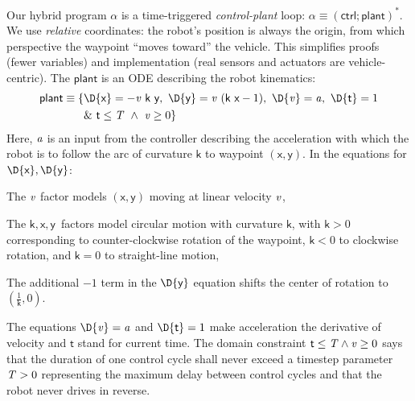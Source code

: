 \documentclass[12pt]{cmuthesis}
\theoremstyle{definition}
\theoremstyle{remark}
\newcommand{\xgvar}{\textsf{x}}
\newcommand{\ygvar}{\textsf{y}}
\newcommand{\kvar}{\textsf{k}}
\newcommand{\tvar}{\textsf{t}}
\newcommand{\ctrl}{\textsf{ctrl}\xspace}
\newcommand{\plant}{\textsf{plant}\xspace}
\begin{document}
Our hybrid program $\alpha$ is a time-triggered \emph{control-plant} loop: $\alpha\equiv(\ctrl;\plant)^*$.
We use \emph{relative} coordinates: the robot's position is always the origin, from which perspective the waypoint ``moves toward'' the vehicle.
This simplifies proofs (fewer variables) and implementation (real sensors and actuators are vehicle-centric).
The $\plant$ is an ODE describing the robot kinematics:
\begin{align*}
\plant\equiv \{&\D{\xgvar}=-\vvar~\kvar~\ygvar,~\D{\ygvar}=\vvar~(\kvar~\xgvar-1),~\D{\vvar}=\avar,~\D{\tvar}=1 \\
 &\&~\tvar\leq \Tvar ~\land~ \vvar \geq 0\} %
\end{align*}
Here, ${\it a}$ is an input from the controller describing the acceleration with which the robot is to follow the arc of curvature $\kvar$ to waypoint $(\xgvar,\ygvar)$.
In the equations for $\D{\xgvar},\D{\ygvar}$: \begin{inparaenum}[\it i)]\item The ${\it v}$ factor models $(\xgvar,\ygvar)$ moving at linear velocity ${\it v}$, \item The $\kvar,\xgvar,\ygvar$\ factors model circular motion with curvature $\kvar$, with $\kvar > 0$ corresponding to counter-clockwise rotation of the waypoint, $\kvar < 0$ to clockwise rotation, and $\kvar = 0$ to straight-line motion, \item The additional $-1$ term in the $\D{\ygvar}$ equation shifts the center of rotation to $\left(\frac{1}{\kvar},0\right)$.
\end{inparaenum}
The equations $\D{\vvar}=\avar$ and $\D{\tvar}=1$ make acceleration the derivative of velocity and $\tvar$ stand for current time.
The domain constraint $\tvar \leq \Tvar \land \vvar \geq 0$ says that the duration of one control cycle shall never exceed a timestep parameter ${\it T} > 0$ representing the maximum delay between control cycles and that the robot never drives in reverse.
\end{document}
